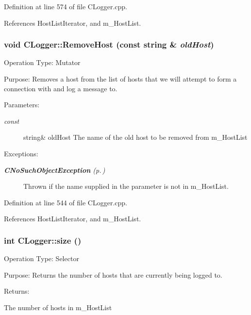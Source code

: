 Definition at line 574 of file CLogger.cpp.

References Host\-List\-Iterator, and m\_\-Host\-List.
\subsubsection{\setlength{\rightskip}{0pt plus 5cm}void CLogger::Remove\-Host (const string \& {\em old\-Host})}\label{classCLogger_a8}


Operation Type: Mutator

Purpose: Removes a host from the list of hosts that we will attempt to form a connection with and log a message to.\begin{Desc}
\item[Parameters: ]\par
\begin{description}
\item[{\em 
const}]string\& old\-Host The name of the old host to be  removed from m\_\-Host\-List \end{description}
\end{Desc}
\begin{Desc}
\item[Exceptions: ]\par
\begin{description}
\item[{\em 
{\bf CNo\-Such\-Object\-Exception} {\rm (p.\,\pageref{classCNoSuchObjectException})}}] Thrown if the name supplied in the parameter is not in m\_\-Host\-List. \end{description}
\end{Desc}


Definition at line 544 of file CLogger.cpp.

References Host\-List\-Iterator, and m\_\-Host\-List.
\subsubsection{\setlength{\rightskip}{0pt plus 5cm}int CLogger::size ()}\label{classCLogger_a6}


Operation Type: Selector

Purpose: Returns the number of hosts that are currently being logged to.

\begin{Desc}
\item[Returns: ]\par
The number of hosts in m\_\-Host\-List \end{Desc}



